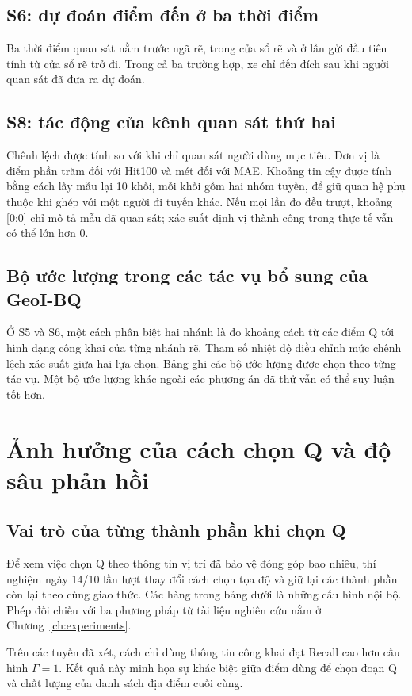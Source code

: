 \section{S6: dự đoán điểm đến ở ba thời điểm}
Ba thời điểm quan sát nằm trước ngã rẽ, trong cửa sổ rẽ và ở lần gửi đầu tiên tính từ cửa sổ rẽ trở đi. Trong cả ba trường hợp, xe chỉ đến đích sau khi người quan sát đã đưa ra dự đoán.

\section{S8: tác động của kênh quan sát thứ hai}
Chênh lệch được tính so với khi chỉ quan sát người dùng mục tiêu. Đơn vị là điểm phần trăm đối với Hit100 và mét đối với MAE. Khoảng tin cậy được tính bằng cách lấy mẫu lại 10 khối, mỗi khối gồm hai nhóm tuyến, để giữ quan hệ phụ thuộc khi ghép với một người đi tuyến khác. Nếu mọi lần đo đều trượt, khoảng [0;0] chỉ mô tả mẫu đã quan sát; xác suất định vị thành công trong thực tế vẫn có thể lớn hơn 0.


\section{Bộ ước lượng trong các tác vụ bổ sung của GeoI-BQ}
Ở S5 và S6, một cách phân biệt hai nhánh là đo khoảng cách từ các điểm Q tới hình dạng công khai của từng nhánh rẽ. Tham số nhiệt độ điều chỉnh mức chênh lệch xác suất giữa hai lựa chọn. Bảng ghi các bộ ước lượng được chọn theo từng tác vụ. Một bộ ước lượng khác ngoài các phương án đã thử vẫn có thể suy luận tốt hơn.


\chapter{Ảnh hưởng của cách chọn Q và độ sâu phản hồi}\label{app:support}
\section{Vai trò của từng thành phần khi chọn Q}
Để xem việc chọn Q theo thông tin vị trí đã bảo vệ đóng góp bao nhiêu, thí nghiệm ngày 14/10 lần lượt thay đổi cách chọn tọa độ và giữ lại các thành phần còn lại theo cùng giao thức. Các hàng trong bảng dưới là những cấu hình nội bộ. Phép đối chiếu với ba phương pháp từ tài liệu nghiên cứu nằm ở Chương~\ref{ch:experiments}.

Trên các tuyến đã xét, cách chỉ dùng thông tin công khai đạt Recall cao hơn cấu hình $\Gamma=1$. Kết quả này minh họa sự khác biệt giữa điểm dùng để chọn đoạn Q và chất lượng của danh sách địa điểm cuối cùng.
